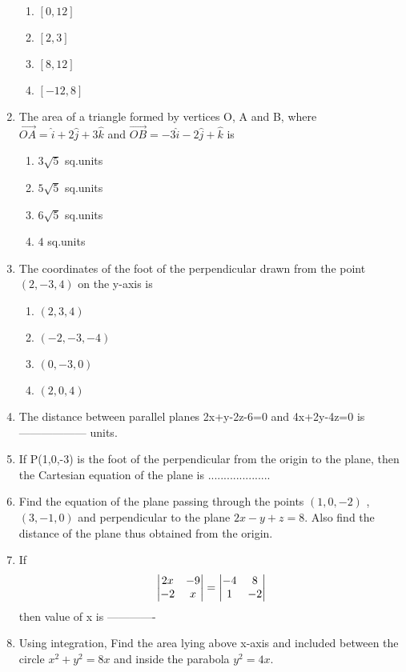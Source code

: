 \documentclass[journal,12pt,twocolumn]{IEEEtran}
\renewcommand\thesection{\arabic{section}}
\begin{document}
\begin{enumerate}[label=\thesection.\arabic*.,ref=\thesection.\theenumi]
\begin{enumerate}
    \item $\left[0,12\right]$
    \item $\left[2,3\right]$
    \item $\left[8,12\right]$
    \item $\left[-12,8\right]$
\end{enumerate}
\item The area of a triangle formed by vertices O, A and B, where $\overrightarrow{OA}=\hat{i} + 2\hat{j} + 3 \hat{k} $ and $\overrightarrow{OB}=-3\hat{i} - 2\hat{j} +  \hat{k} $ is \\
 \begin{enumerate}
     \item $ 3\sqrt{5} $ sq.units\\
    \item$ 5\sqrt{5} $ sq.units\\
    \item$ 6\sqrt{5} $ sq.units\\
    \item$ 4 $ sq.units
\end{enumerate}
\item  The coordinates of the foot of the perpendicular drawn from the point $ \left(2,-3,4 \right) $ on the y-axis is 

\begin{enumerate}
    \item $\left(2,3,4\right)$
    \item $\left(-2,-3,-4\right)$
    \item $\left(0,-3,0\right)$
    \item $\left(2,0,4\right)$
\end{enumerate}
\item  The distance between parallel planes 2x+y-2z-6=0 and 4x+2y-4z=0 is ------------------ units.

\item If P(1,0,-3) is the foot of the perpendicular from the origin to the plane, then the Cartesian equation of the plane is .................... \\
    
\item Find the equation of the plane passing through the points $(1,0,-2)$ , $(3,-1,0)$ and perpendicular to the plane $ 2x-y+z=8 $. Also find the distance of the plane thus obtained from the origin.\\
\item  If \begin{align} \begin{vmatrix}2x & -9 \\ -2 & x\end{vmatrix}  = \begin{vmatrix}-4 & 8 \\ 1 & -2 \end{vmatrix} \nonumber \end{align} then value of x is -------------\\
 \item Using integration, Find the area lying above x-axis and included between the circle $ x^2 + y^2 =8x $ and inside the parabola $ y^2 =4x $.   
    

\end{enumerate}
\end{document}
